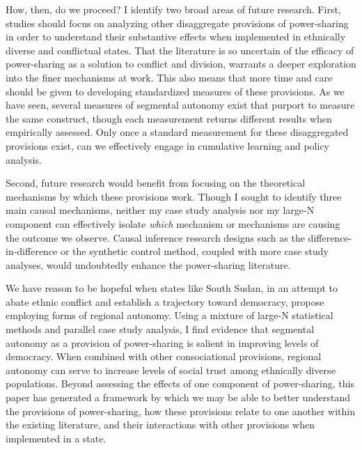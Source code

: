 \documentclass[12pt]{article}
\begin{document}
How, then, do we proceed? I identify two broad areas of future research. First, studies should focus on analyzing other disaggregate provisions of power-sharing in order to understand their substantive effects when implemented in ethnically diverse and conflictual states. That the literature is so uncertain of the efficacy of power-sharing as a solution to conflict and division, warrants a deeper exploration into the finer mechanisms at work. This also means that more time and care should be given to developing standardized measures of these provisions. As we have seen, several measures of segmental autonomy exist that purport to measure the same construct, though each measurement returns different results when empirically assessed. Only once a standard measurement for these disaggregated provisions exist, can we effectively engage in cumulative learning and policy analysis.  

Second, future research would benefit from focusing on the theoretical mechanisms by which these provisions work. Though I sought to identify three main causal mechanisms, neither my case study analysis nor my large-N component can effectively isolate \textit{which} mechanism or mechanisms are causing the outcome we observe. Causal inference research designs such as the difference-in-difference or the synthetic control method, coupled with more case study analyses, would undoubtedly enhance the power-sharing literature.

We have reason to be hopeful when states like South Sudan, in an attempt to abate ethnic conflict and establish a trajectory toward democracy, propose employing forms of regional autonomy. Using a mixture of large-N statistical methods and parallel case study analysis, I find evidence that segmental autonomy as a provision of power-sharing is salient in improving levels of democracy. When combined with other consociational provisions, regional autonomy can serve to increase levels of social trust among ethnically diverse populations. Beyond assessing the effects of one component of power-sharing, this paper has generated a framework by which we may be able to better understand the provisions of power-sharing, how these provisions relate to one another within the existing literature, and their interactions with other provisions when implemented in a state.

\pagebreak

\printbibliography

\pagebreak
\end{document}
